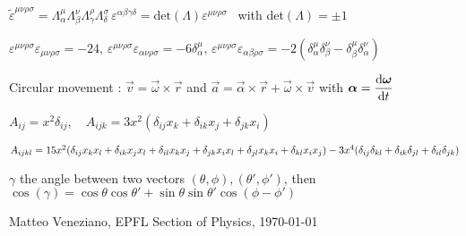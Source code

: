 
\item$\tilde{\varepsilon}^{\mu\nu\rho\sigma} = \Lambda^{\mu}_{\alpha}\Lambda^{\nu}_{\beta}\Lambda^{\rho}_{\gamma}\Lambda^{\sigma}_{\delta} \, \varepsilon^{\alpha\beta\gamma\delta} = \text{det}(\Lambda)\varepsilon^{\mu\nu\rho\sigma}$ \, with det$(\Lambda) = \pm 1$

\item$\varepsilon^{\mu\nu\rho\sigma}\varepsilon_{\mu\nu\rho\sigma} = -24, \, \varepsilon^{\mu\nu\rho\sigma}\varepsilon_{\alpha\nu\rho\sigma} = -6\delta^{\mu}_{\alpha}, \, \varepsilon^{\mu\nu\rho\sigma}\varepsilon_{\alpha\beta\rho\sigma} = -2(\delta^{\mu}_{\alpha}\delta^{\nu}_{\beta} - \delta^{\mu}_{\beta}\delta^{\nu}_{\alpha})$

\item Circular movement : $\vec{v} = \vec{\omega} \times \vec{r}$ and $\vec{a} = \vec{\alpha} \times \vec{r} + \vec{\omega} \times \vec{v}$ with $\mbox{\boldmath$\alpha$} = \dfrac{\textrm{d} \mbox{\boldmath$\omega$}}{\textrm{d} t}$

\item $A_{ij} = x^2 \delta_{ij}, \quad A_{ijk} = 3x^2(\delta_{ij}x_k + \delta_{ik}x_j + \delta_{jk}x_i)$

\item $A_{ijkl} = 15x^2(\delta_{ij}x_kx_l + \delta_{ik}x_jx_l + \delta_{il}x_kx_j + \delta_{jk}x_ix_l + \delta_{jl}x_kx_i + \delta_{kl}x_ix_j) -\\
3x^4(\delta_{ij}\delta_{kl} + \delta_{ik}\delta_{jl} + \delta_{il}\delta_{jk})$

\item $\gamma$ the angle between two vectors $(\theta, \phi), (\theta', \phi')$, then \\ $\cos(\gamma) = \cos\theta \cos\theta' + \sin\theta \sin\theta' \cos(\phi - \phi')$
\squishend

\vfill 
Matteo Veneziano, EPFL Section of Physics, \today